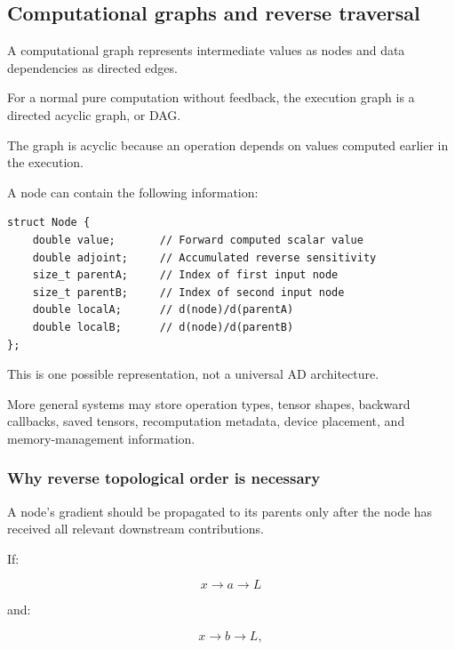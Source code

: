 \subsection{Computational graphs and reverse traversal}\label{02-foundations-ii-ch022-computational-graphs-and-reverse-traversal}

\hypertarget{02-foundations-ii-ch022-computational-graphs-and-reverse-traversal}{}

A computational graph represents intermediate values as nodes and data dependencies as directed edges.

For a normal pure computation without feedback, the execution graph is a directed acyclic graph, or DAG.

The graph is acyclic because an operation depends on values computed earlier in the execution.

A node can contain the following information:

\begin{verbatim}
struct Node {
    double value;       // Forward computed scalar value
    double adjoint;     // Accumulated reverse sensitivity
    size_t parentA;     // Index of first input node
    size_t parentB;     // Index of second input node
    double localA;      // d(node)/d(parentA)
    double localB;      // d(node)/d(parentB)
};
\end{verbatim}

This is one possible representation, not a universal AD architecture.

More general systems may store operation types, tensor shapes, backward callbacks, saved tensors, recomputation metadata, device placement, and memory-management information.

\subsubsection{Why reverse topological order is necessary}\label{02-foundations-ii-ch022-why-reverse-topological-order-is-necessary}

\hypertarget{02-foundations-ii-ch022-why-reverse-topological-order-is-necessary}{}

A node's gradient should be propagated to its parents only after the node has received all relevant downstream contributions.

If:

\[
x\rightarrow a\rightarrow L
\]

and:

\[
x\rightarrow b\rightarrow L,
\]

